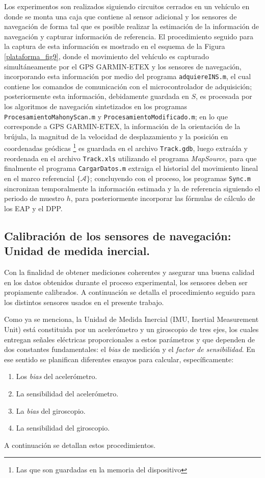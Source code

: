 \documentclass[10pt]{report}
\numberwithin{equation}{chapter}
\numberwithin{algorithm}{chapter}
\newcommand{\bias}{\emph{bias} }
\newcommand{\marco}[1]{\{\mathcal{#1}\}}
\begin{document}
Los experimentos son realizados siguiendo circuitos cerrados en un vehículo en donde se monta una caja que contiene al sensor adicional y los sensores de navegación de forma tal que es posible realizar la estimación de la información de navegación y capturar información de referencia. El procedimiento seguido para la captura de esta información es mostrado en el esquema de la Figura \ref{plataforma_fig9}, donde el movimiento del vehículo es capturado simultáneamente por el GPS GARMIN-ETEX y los sensores de navegación, incorporando esta información por medio del programa \texttt{adquiereINS.m}, el cual contiene los comandos de comunicación con el microcontrolador de adquisición; posteriormente esta información, debidamente guardada en $S$, es procesada por los algoritmos de navegación sintetizados en los programas \texttt{ProcesamientoMahonyScan.m} y \texttt{ProcesamientoModificado.m}; en lo que corresponde a GPS GARMIN-ETEX, la información de la orientación de la brújula, la magnitud de la velocidad de desplazamiento y la posición en coordenadas geódicas \footnote{Las que son guardadas en la memoria del dispositivo} es guardada en el archivo \texttt{Track.gdb}, luego extraída y reordenada en el archivo \texttt{Track.xls} utilizando el programa \emph{MapSource}, para que finalmente el programa \texttt{CargarDatos.m} extraiga el historial del movimiento lineal en el marco referencial $\marco{A}$; concluyendo con el proceso, los programas \texttt{Sync.m} sincronizan temporalmente la información estimada y la de referencia siguiendo el periodo de muestro $h$, para posteriormente incorporar las fórmulas de cálculo de los EAP y el DPP.
\subsection{Calibración de los sensores de navegación: Unidad de medida inercial.}
Con la finalidad de obtener mediciones coherentes y asegurar una buena calidad en los datos obtenidos durante el proceso experimental, los sensores deben ser propiamente calibrados. A continuación se detalla el procedimiento seguido para los distintos sensores usados en el presente trabajo.\par
Como ya se menciona, la Unidad de Medida Inercial (IMU, Inertial Measurement Unit) está constituida por un acelerómetro y un giroscopio de tres ejes, los cuales entregan señales eléctricas proporcionales a estos parámetros y que dependen de dos constantes fundamentales: el \bias de medición y el \emph{factor de sensibilidad}. En ese sentido se planifican diferentes ensayos para calcular, específicamente:
\begin{enumerate}
\item Los \bias del acelerómetro.
\item La sensibilidad del acelerómetro.
\item La \bias del giroscopio.
\item La sensibilidad del giroscopio.
\end{enumerate}
A continuación se detallan estos procedimientos.
\end{document}
